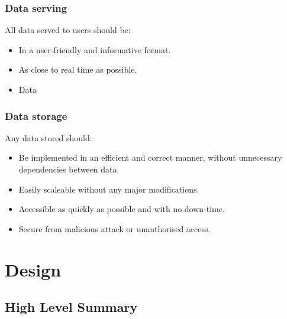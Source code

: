 \documentclass{l4proj}
\begin{document}
\subsection{Data serving}
All data served to users should be:
\begin{itemize}	
  \item In a user-friendly and informative format.
  \item As close to real time as possible.
  \item Data 

\end{itemize}

\subsection{Data storage}
Any data stored should:
\begin{itemize}	
  \item Be implemented in an efficient and correct manner, without unnecessary dependencies between data.
  \item Easily scaleable without any major modifications.
  \item Accessible as quickly as possible and with no down-time.
  \item Secure from malicious attack or unauthorised access.
\end{itemize}



\chapter{Design}
\section{High Level Summary}
\end{document}
